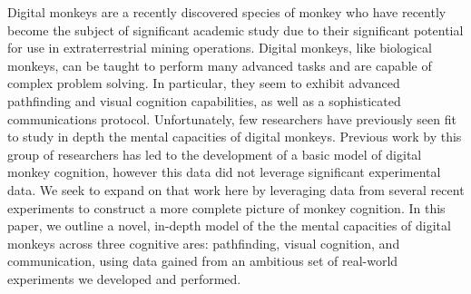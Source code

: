 Digital monkeys are a recently discovered species of monkey who have recently become the
subject of significant academic study due to their significant potential for use in
extraterrestrial mining operations.
Digital monkeys, like biological monkeys, can be taught to perform many advanced tasks and are
capable of complex problem solving.
In particular, they seem to exhibit advanced pathfinding and visual cognition capabilities, as well
as a sophisticated communications protocol.
Unfortunately, few researchers have previously seen fit to study in depth the mental capacities of
digital monkeys.
Previous work by this group of researchers has led to the development of a basic model of digital
monkey cognition\cite{sub_verif_plan}, however this data did not leverage significant experimental
data.
We seek to expand on that work here by leveraging data from several recent experiments to
construct a more complete picture of monkey cognition.
In this paper, we outline a novel, in-depth model of the the mental capacities of digital monkeys
across three cognitive ares: pathfinding, visual cognition, and communication, using data gained
from an ambitious set of real-world experiments we developed and performed.